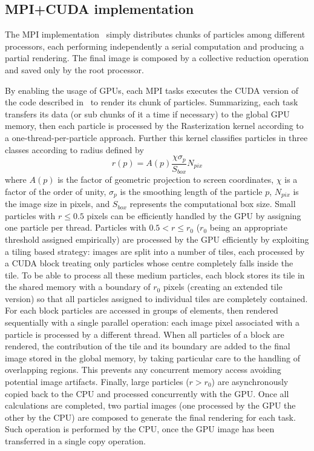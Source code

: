 \documentclass{egpubl}
\begin{document}
\subsection{MPI+CUDA implementation}
The MPI implementation~\cite{JKR*10} simply distributes chunks of particles among different processors, each performing independently a serial computation and producing a partial rendering. The final image is composed by a collective reduction operation and saved only by the root processor.

By enabling the usage of GPUs, each MPI tasks executes the CUDA version of the code described in~\cite{RGD*14} to render its chunk of particles. 
Summarizing, each task transfers its data (or sub chunks of it a time if necessary) to the global GPU memory, then each particle is processed by the Rasterization kernel according to a one-thread-per-particle approach. Further this kernel classifies particles in three classes according to radius defined by
\begin{equation}
r(p) = A(p)\frac{\chi \sigma_p}{S_{box}}N_{pix} 
\end{equation}
where $A(p)$ is the factor of geometric projection to screen coordinates, $\chi$ is a factor of the order of unity, $\sigma_p$ is the smoothing length of the particle $p$, $N_{pix}$ is the image size in pixels, and $S_{box}$ represents the computational box size. Small particles with $r \le 0.5$ pixels can be efficiently handled by the GPU by assigning one particle per thread. Particles with $0.5 < r \le r_0$ ($r_0$ being an appropriate threshold assigned empirically) are processed by the GPU efficiently by exploiting a tiling based strategy: images are split into a number of tiles, each processed by a CUDA block treating only particles whose centre completely falls inside the tile. To be able to process all these medium particles, each block stores its tile in the shared memory with a boundary of $r_0$ pixels (creating an extended tile version) so that all particles assigned to individual tiles are completely contained. For each block particles are accessed in groups of elements, then rendered sequentially with a single parallel operation: each image pixel associated with a particle is processed by a different thread. When all particles of a block are rendered, the contribution of the tile and its boundary are added to the final image stored in the global memory, by taking particular care to the handling of overlapping regions. This prevents any concurrent memory access avoiding potential image artifacts. Finally, large particles ($r>r_0$) are asynchronously copied back to the CPU and processed concurrently with the GPU.
Once all calculations are completed, two partial images (one processed by the GPU the other by the CPU) are composed to generate the final rendering for each task. Such operation is performed by the CPU, once the GPU image has been transferred in a single copy operation.
\end{document}

